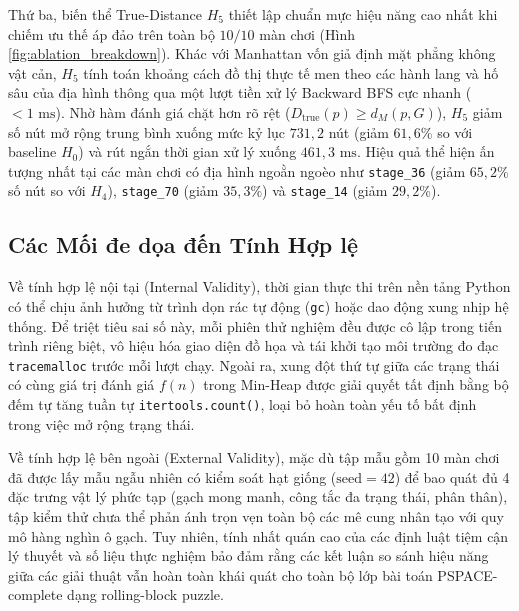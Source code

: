 Thứ ba, biến thể True-Distance $H_5$ thiết lập chuẩn mực hiệu năng cao nhất
khi chiếm ưu thế áp đảo trên toàn bộ $10/10$ màn chơi (Hình
\ref{fig:ablation_breakdown}). Khác với Manhattan vốn giả định mặt phẳng
không vật cản, $H_5$ tính toán khoảng cách đồ thị thực tế men theo các hành
lang và hố sâu của địa hình thông qua một lượt tiền xử lý Backward BFS
cực nhanh ($< 1\text{ ms}$). Nhờ hàm đánh giá chặt hơn rõ rệt
($D_{\text{true}}(p) \ge d_M(p, G)$), $H_5$ giảm số nút mở rộng trung bình
xuống mức kỷ lục $731,2$ nút (giảm $61,6\%$ so với baseline $H_0$) và rút
ngắn thời gian xử lý xuống $461,3\text{ ms}$. Hiệu quả thể hiện ấn tượng
nhất tại các màn chơi có địa hình ngoằn ngoèo như \texttt{stage\_36} (giảm
$65,2\%$ số nút so với $H_4$), \texttt{stage\_70} (giảm $35,3\%$) và
\texttt{stage\_14} (giảm $29,2\%$).

\subsection{Các Mối đe dọa đến Tính Hợp lệ}
\label{subsec:threats_validity}

Về tính hợp lệ nội tại (Internal Validity), thời gian thực thi trên nền
tảng Python có thể chịu ảnh hưởng từ trình dọn rác tự động (\texttt{gc})
hoặc dao động xung nhịp hệ thống. Để triệt tiêu sai số này, mỗi phiên
thử nghiệm đều được cô lập trong tiến trình riêng biệt, vô hiệu hóa giao
diện đồ họa và tái khởi tạo môi trường đo đạc \texttt{tracemalloc} trước
mỗi lượt chạy. Ngoài ra, xung đột thứ tự giữa các trạng thái có cùng giá
trị đánh giá $f(n)$ trong Min-Heap được giải quyết tất định bằng bộ đếm tự
tăng tuần tự \texttt{itertools.count()}, loại bỏ hoàn toàn yếu tố bất định
trong việc mở rộng trạng thái.

Về tính hợp lệ bên ngoài (External Validity), mặc dù tập mẫu gồm 10 màn
chơi đã được lấy mẫu ngẫu nhiên có kiểm soát hạt giống ($\text{seed}=42$)
để bao quát đủ 4 đặc trưng vật lý phức tạp (gạch mong manh, công tắc đa
trạng thái, phân thân), tập kiểm thử chưa thể phản ánh trọn vẹn toàn bộ các
mê cung nhân tạo với quy mô hàng nghìn ô gạch. Tuy nhiên, tính nhất quán
cao của các định luật tiệm cận lý thuyết và số liệu thực nghiệm bảo đảm
rằng các kết luận so sánh hiệu năng giữa các giải thuật vẫn hoàn toàn khái
quát cho toàn bộ lớp bài toán PSPACE-complete dạng rolling-block puzzle.
